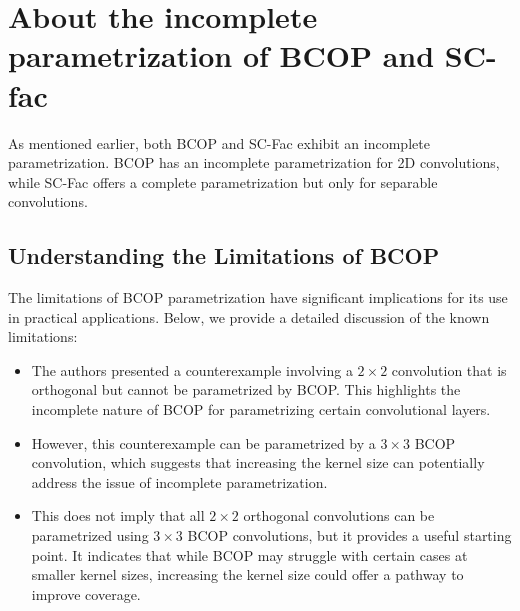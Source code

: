     
    



\section{About the incomplete parametrization of BCOP and SC-fac} \label{sec:ap_incomplete}


    As mentioned earlier, both BCOP and SC-Fac exhibit an incomplete parametrization. BCOP has an incomplete parametrization for 2D convolutions, while SC-Fac offers a complete parametrization but only for separable convolutions.
    
    \subsection{Understanding the Limitations of BCOP}
    The limitations of BCOP parametrization have significant implications for its use in practical applications. Below, we provide a detailed discussion of the known limitations:
    
    \begin{itemize}
        \item The authors presented a counterexample involving a $2\times 2$ convolution that is orthogonal but cannot be parametrized by BCOP. This highlights the incomplete nature of BCOP for parametrizing certain convolutional layers.
        \item However, this counterexample can be parametrized by a $3\times 3$ BCOP convolution, which suggests that increasing the kernel size can potentially address the issue of incomplete parametrization.
        \item This does not imply that all $2\times 2$ orthogonal convolutions can be parametrized using $3\times 3$ BCOP convolutions, but it provides a useful starting point. It indicates that while BCOP may struggle with certain cases at smaller kernel sizes, increasing the kernel size could offer a pathway to improve coverage.
    \end{itemize}
    
